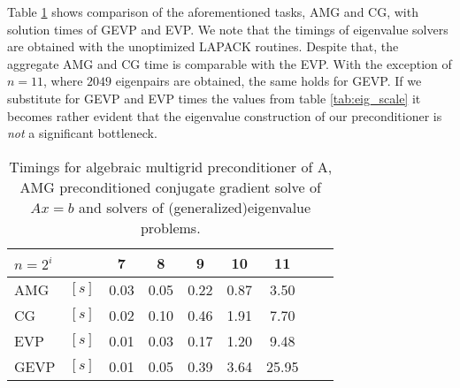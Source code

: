 \documentclass[10pt, a4paper]{article}
\begin{document}
Table \ref{tab:performance} shows comparison of the aforementioned tasks, AMG
and CG, with solution times of GEVP and EVP. We note that the timings of
eigenvalue solvers are obtained with the unoptimized LAPACK routines. Despite
that, the aggregate AMG and CG time is comparable with the EVP. With the exception 
of $n=11$, where $2049$ eigenpairs are obtained, the same holds for GEVP. If we
substitute for GEVP and EVP times the values from table \ref{tab:eig_scale} it
becomes rather evident that the eigenvalue construction of our preconditioner is
\textit{not} a significant bottleneck.
%
\begin{table}[ht]
  \caption{Timings for algebraic multigrid preconditioner of A, AMG preconditioned 
  conjugate gradient solve of $Ax=b$ and solvers of (generalized)eigenvalue
  problems.}
\label{tab:performance}
\footnotesize{
\begin{tabular}{lr|ccccccc}
\multicolumn{2}{l|}{$n=2^i$} &  7    &     8 &     9 & 10    & 11\\
\hline
AMG   & $\left[s\right]$     & 0.03  &  0.05 &  0.22 &  0.87 & 3.50\\
CG    & $\left[s\right]$     & 0.02  &  0.10 &  0.46 &  1.91 & 7.70\\
EVP   & $\left[s\right]$     & 0.01  & 0.03  & 0.17  & 1.20  & 9.48\\
GEVP  & $\left[s\right]$     & 0.01  & 0.05  & 0.39  & 3.64  & 25.95\\
\end{tabular}
}
\end{table}
\end{document}
